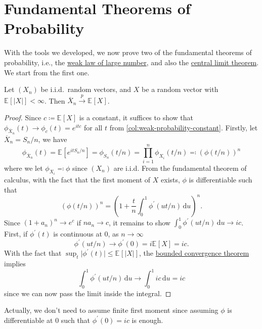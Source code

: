 \section{Fundamental Theorems of Probability}
With the tools we developed, we now prove two of the fundamental theorems of probability, i.e., the \hyperref[thm:WLLN]{weak law of large number}, and also the \hyperref[thm:CLT]{central limit theorem}. We start from the first one.

\begin{theorem}\label{thm:WLLN}
	Let \((X_n)\) be i.i.d.\ random vectors, and \(X\) be a random vector with \(\mathbb{E}_{}[\vert X \vert ] < \infty \). Then \(\overline{X} _n \overset{p}{\to } \mathbb{E}_{}[X] \).
\end{theorem}
\begin{proof}
	Since \(c \coloneqq \mathbb{E}_{}[X] \) is a constant, it suffices to show that \(\phi _{\overline{X} _n}(t) \to \phi _{c} (t) = e^{itc}\) for all \(t\) from \autoref{col:weak-probability-constant}. Firstly, let \(\overline{X} _n = S_n / n\), we have
	\[
		\phi _{\overline{X} _n}(t)
		= \mathbb{E}_{}[e^{it S_n / n}]
		= \phi _{S_n}(t / n)
		= \prod_{i=1}^{n} \phi _{X_i}(t / n)
		\eqqcolon \left( \phi (t / n) \right) ^n
	\]
	where we let \(\phi _{X_i} \eqqcolon \phi \) since \((X_n)\) are i.i.d. From the fundamental theorem of calculus, with the fact that the first moment of \(X\) exists, \(\phi \) is differentiable such that
	\[
		\left( \phi (t / n) \right) ^n
		= \left( 1 + \frac{t}{n} \int_{0}^{1} \phi ^{\prime} (u t / n) \,\mathrm{d}u  \right) ^n .
	\]
	Since \((1 + a_n)^n \to e^c\) if \(n a_n \to c\), it remains to show \(\int_{0}^{1} \phi ^{\prime} (u t / n) \,\mathrm{d}u \to ic\). First, if \(\phi ^{\prime} (t)\) is continuous at \(0\), as \(n \to \infty \)
	\[
		\phi ^{\prime} (u t / n) \to \phi ^{\prime} (0) = i \mathbb{E}_{}[X] = ic.
	\]
	With the fact that \(\sup _t \vert \phi ^{\prime} (t) \vert \leq \mathbb{E}_{}[\vert X \vert ] \), the \href{https://en.wikipedia.org/wiki/Dominated_convergence_theorem}{bounded convergence theorem} implies
	\[
		\int_{0}^{1} \phi ^{\prime} (ut / n) \,\mathrm{d}u
		\to \int_{0}^{1} ic \,\mathrm{d}u
		= ic
	\]
	since we can now pass the limit inside the integral.
\end{proof}

\begin{remark}
	Actually, we don't need to assume finite first moment since assuming \(\phi \) is differentiable at \(0\) such that \(\phi ^{\prime} (0) = ic\) is enough.
\end{remark}

